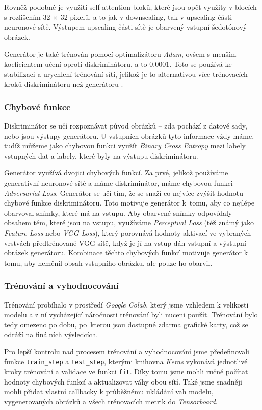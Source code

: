 \documentclass[12pt, a4paper]{article}
\begin{document}
    Rovněž podobné je využití self-attention bloků, které jsou opět využity v blocích s rozlišením 32 $\times$ 32 pixelů, a to jak v downscaling, tak v upscaling části neuronové sítě. Výstupem upscaling části sítě je obarvený vstupní šedotónový obrázek. 
    
    Generátor je také trénován pomocí optimalizátoru \textit{Adam}, ovšem s menším koeficientem učení oproti diskriminátoru, a to $0.0001$. Toto se používá ke stabilizaci a urychlení trénování sítí, jelikož je to alternativou více trénovacích kroků diskriminátoru než generátoru \cite{ttur}. 
    
    \subsubsection{Chybové funkce}
    Diskriminátor se učí rozpoznávat původ obrázků -- zda pochází z datové sady, nebo jsou výstupy generátoru. U vstupních obrázků tyto informace vždy máme, tudíž můžeme jako chybovou funkci využít \textit{Binary Cross Entropy} mezi labely vstupných dat a labely, které byly na výstupu diskriminátoru.
    
    Generátor využívá dvojici chybových funkcí. Za prvé, jelikož používáme generativní neuronové sítě a máme diskriminátor, máme chybovou funkci \textit{Adversarial Loss}. Generátor se učí tím, že se snaží co nejvíce zvýšit hodnotu chybové funkce diskriminátoru. Toto motivuje generátor k~tomu, aby co nejlépe obarvoval snímky, které má na vstupu.
    Aby obarvené snímky odpovídaly obsahem těm, které jsou na vstupu, využíváme \textit{Perceptual Loss} (též známý jako \textit{Feature Loss} nebo \textit{VGG Loss}), který porovnává hodnoty aktivací ve vybraných vrstvách předtrénované VGG sítě, když je jí na vstup dán vstupní a výstupní obrázek generátoru.
    Kombinace těchto chybových funkcí motivuje generátor k tomu, aby neměnil obsah vstupního obrázku, ale pouze ho obarvil.
    
    \subsubsection{Trénování a vyhodnocování}
    Trénování probíhalo v prostředí \textit{Google Colab}, který jsme vzhledem k velikosti modelu a z ní vycházející náročnosti trénování byli nuceni použít. Trénování bylo tedy omezeno po dobu, po~kterou jsou dostupné zdarma grafické karty, což se odráží na finálních výsledcích. 
    
    Pro lepší kontrolu nad procesem trénování a vyhodnocování jsme předefinovali funkce \texttt{train\_step} a \texttt{test\_step}, kterými knihovna \textit{Keras} vykonává jednotlivé kroky trénování a validace ve funkci \texttt{fit}. Díky tomu jsme mohli ručně počítat hodnoty chybových funkcí a aktualizovat váhy obou sítí. Také jsme snadněji mohli přidat vlastní callbacky k průběžnému ukládání vah modelu, vygenerovaných obrázků a všech trénovacích metrik do \textit{Tensorboard}.
    
\end{document}
